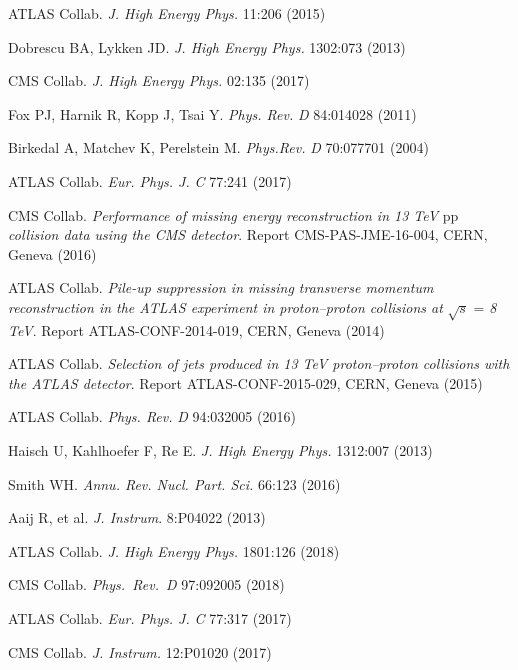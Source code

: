 \documentclass{ar-1col}
\begin{document}
\begin{thebibliography}{175}
{ATLAS Collab.} \textit{J. High Energy Phys.} 11:206 (2015)

Dobrescu BA, Lykken JD. \textit{J. High Energy Phys.} 1302:073 (2013)

{CMS Collab}. \textit{J. High Energy Phys.} 02:135 (2017)

Fox PJ, Harnik R, Kopp J, Tsai Y. \textit{Phys. Rev.} \textit{D} 84:014028
(2011)

Birkedal A, Matchev K, Perelstein M. \textit{Phys.Rev.} \textit{D} 70:077701
(2004)

{ATLAS Collab.} \textit{Eur. Phys. J.} \textit{C} 77:241 (2017)

{CMS Collab}. \textit{Performance of missing energy reconstruction in 13 TeV }pp \textit{collision data using the CMS detector}.
Report CMS-PAS-JME-16-004, CERN, Geneva (2016)

ATLAS Collab. \textit{Pile-up suppression in missing transverse momentum reconstruction in the ATLAS experiment in proton--proton collisions at} $\sqrt{s}$ = \textit{8 TeV}. Report ATLAS-CONF-2014-019, CERN, Geneva (2014)

ATLAS Collab. \textit{Selection of jets produced in 13 TeV proton--proton collisions with the ATLAS detector}.
Report ATLAS-CONF-2015-029, CERN, Geneva (2015)

{ATLAS Collab.} \textit{Phys. Rev.} \textit{D} 94:032005 (2016)

Haisch U, Kahlhoefer F, Re E. \textit{J. High Energy Phys.} 1312:007 (2013)

Smith WH. \textit{Annu. Rev. Nucl. Part. Sci.} 66:123 (2016)


Aaij R, {et al.} \textit{J. Instrum}. {8}:P04022 (2013)

{ATLAS Collab.} \textit{J. High Energy Phys.} {1801}:126 (2018)

{CMS Collab.} \textit{Phys.\ Rev.\ D} {97}:092005 (2018)

{ATLAS Collab}.  \textit{Eur. Phys. J.} \textit{C} 77:317 (2017)

CMS Collab. \textit{J. Instrum.} 12:P01020 (2017)




\end{thebibliography}
\end{document}
